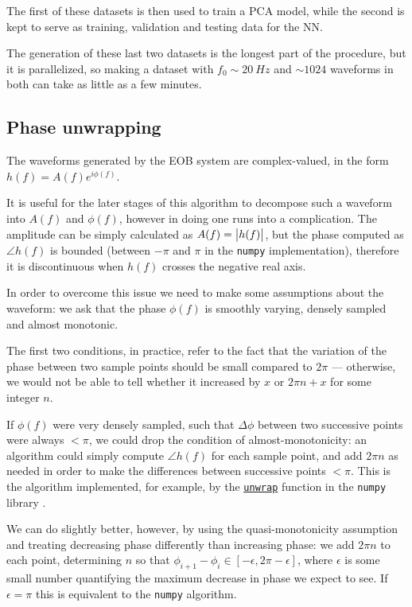 \documentclass[main.tex]{subfiles}
\begin{document}
The first of these datasets is then used to train a \ac{PCA} model, while the second is kept to serve as training, validation and testing data for the \ac{NN}.

The generation of these last two datasets is the longest part of the procedure, but it is parallelized, so making a dataset with \(f_0 \sim \SI{20}{Hz}\) and \(\sim 1024\) waveforms in both can take as little as a few minutes.

\subsection{Phase unwrapping} \label{sec:unwrapping}

The waveforms generated by the \ac{EOB} system are complex-valued, in the form \(h(f) = A(f) e^{i \phi (f)}\).

It is useful for the later stages of this algorithm to decompose such a waveform into \(A(f)\) and \(\phi (f)\), however in doing one runs into a complication.
The amplitude can be simply calculated as \(A(f) = \abs{h(f)}\), but the phase computed as \(\angle h(f)\) is bounded (between \(-\pi \) and \( \pi \) in the \texttt{numpy} implementation), therefore it is discontinuous when \(h(f)\) crosses the negative real axis. 

In order to overcome this issue we need to make some assumptions about the waveform: we ask that the phase \(\phi (f)\) is smoothly varying, densely sampled and almost monotonic. 

The first two conditions, in practice, refer to the fact that the variation of the phase between two sample points should be small compared to \(2 \pi \) --- otherwise, we would not be able to tell whether it increased by \(x\) or \(2 \pi n + x\) for some integer \(n\). 

If \(\phi (f)\) were very densely sampled, such that \(\Delta \phi \) between two successive points were always \(< \pi \), we could drop the condition of almost-monotonicity: an algorithm could simply compute \(\angle h(f)\) for each sample point, and add \(2 \pi n\) as needed in order to make the differences between successive points \(< \pi \). 
This is the algorithm implemented, for example, by the \href{https://numpy.org/doc/stable/reference/generated/numpy.unwrap.html}{\texttt{unwrap}} function in the \texttt{numpy} library \cite{harrisArrayProgrammingNumPy2020}.

We can do slightly better, however, by using the quasi-monotonicity assumption and treating decreasing phase differently than increasing phase: we add \(2 \pi n\) to each point, determining \(n\) so that \(\phi _{i+1} - \phi _i \in [- \epsilon , 2 \pi - \epsilon ]\), where \(\epsilon \) is some small number quantifying the maximum decrease in phase we expect to see.
If \(\epsilon = \pi \) this is equivalent to the \texttt{numpy} algorithm. 
\end{document}
